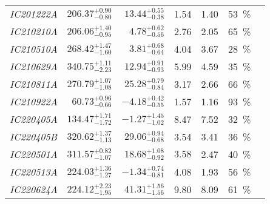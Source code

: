 \begin{table*}
\begin{tabular}{l r r r r c c}
    \emph{IC201222A} & $206.37^{+0.90}_{-0.80}$ & $13.44^{+0.55}_{-0.38}$  & 1.54                 & 1.40                 & \SI{53}{\percent}  & \cite{IC201222A1, IC201222A2}                         \\
    \emph{IC210210A} & $206.06^{+1.40}_{-0.95}$ & $4.78^{+0.62}_{-0.56}$   & 2.76                 & 2.05                 & \SI{65}{\percent}  & \cite{IC210210A1, IC210210A2}                         \\
    \emph{IC210510A} & $268.42^{+1.47}_{-1.60}$ & $3.81^{+0.68}_{-0.64}$   & 4.04                 & 3.67                 & \SI{28}{\percent}  & \cite{IC210510A1, IC210510A2}                         \\
    \emph{IC210629A} & $340.75^{+1.11}_{-2.23}$ & $12.94^{+0.91}_{-0.93}$  & 5.99                 & 4.59                 & \SI{35}{\percent}  & \cite{IC210629A1, IC210629A2, IC210629A3}             \\
    \emph{IC210811A} & $270.79^{+1.07}_{-1.08}$ & $25.28^{+0.79}_{-0.84}$  & 3.17                 & 2.66                 & \SI{66}{\percent}  & \cite{IC210811A1, IC210811A2}                         \\
    \emph{IC210922A} & $60.73^{+0.96}_{-0.66}$  & $-4.18^{+0.42}_{-0.55}$  & 1.57                 & 1.16                 & \SI{93}{\percent}  & \cite{IC210922A1, IC210922A2}                         \\
    \emph{IC220405A} & $134.47^{+1.71}_{-1.72}$ & $-1.27^{+1.45}_{-1.02}$  & 8.47                 & 7.52                 & \SI{32}{\percent}  & \cite{IC220405A1, IC220405A2}                         \\
    \emph{IC220405B} & $320.62^{+1.37}_{-1.13}$ & $29.06^{+0.94}_{-0.68}$  & 3.54                 & 3.41                 & \SI{36}{\percent}  & \cite{IC220405B1, IC220405A2}                         \\
    \emph{IC220501A} & $311.57^{+0.82}_{-1.07}$ & $18.68^{+1.08}_{-0.92}$  & $3.58$               & 2.47                 & \SI{40}{\percent}  & \cite{IC220501A1, IC220501A2}                         \\
    \emph{IC220513A} & $224.03^{+1.36}_{-1.27}$ & $-1.34^{+0.74}_{-0.81}$  & 4.08                 & 1.93                 & \SI{56}{\percent}  & \cite{IC220513A1, IC220513A2}                         \\
    \emph{IC220624A} & $224.12^{+2.23}_{-1.95}$ & $41.31^{+1.56}_{-1.56}$  & 9.80                 & 8.09                 & \SI{61}{\percent}  & \cite{IC220624A1, IC220624A2}                         \\

\end{tabular}
\end{table*}
